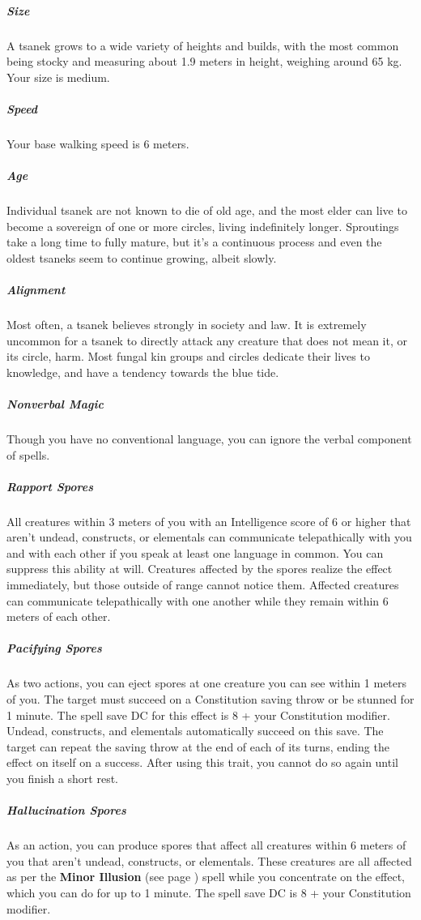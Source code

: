     \subparagraph{Size} A tsanek grows to a wide variety of heights and builds, with the most common being stocky and measuring about 1.9 meters in height, weighing around 65 kg.
    Your size is medium.

    \subparagraph{Speed} Your base walking speed is 6 meters.

    \subparagraph{Age} Individual tsanek are not known to die of old age, and the most elder can live to become a sovereign of one or more circles, living indefinitely longer.
    Sproutings take a long time to fully mature, but it's a continuous process and even the oldest tsaneks seem to continue growing, albeit slowly.

    \subparagraph{Alignment} Most often, a tsanek believes strongly in society and law.
    It is extremely uncommon for a tsanek to directly attack any creature that does not mean it, or its circle, harm.
    Most fungal kin groups and circles dedicate their lives to knowledge, and have a tendency towards the blue tide.

    \subparagraph{Nonverbal Magic} Though you have no conventional language, you can ignore the verbal component of spells.

    \subparagraph{Rapport Spores} All creatures within 3 meters of you with an Intelligence score of 6 or higher that aren't undead, constructs, or elementals can communicate telepathically with you and with each other if you speak at least one language in common.
    You can suppress this ability at will.
    Creatures affected by the spores realize the effect immediately, but those outside of range cannot notice them.
    Affected creatures can communicate telepathically with one another while they remain within 6 meters of each other.

    \subparagraph{Pacifying Spores} \label{kin::tsanek.pacifyingspores}
    As two actions, you can eject spores at one creature you can see within 1 meters of you.
    The target must succeed on a Constitution saving throw or be stunned for 1 minute.
    The spell save DC for this effect is 8 + your Constitution modifier.
    Undead, constructs, and elementals automatically succeed on this save.
    The target can repeat the saving throw at the end of each of its turns, ending the effect on itself on a success.
    After using this trait, you cannot do so again until you finish a short rest.

    \subparagraph{Hallucination Spores} As an action, you can produce spores that affect all creatures within 6 meters of you that aren't undead, constructs, or elementals.
    These creatures are all affected as per the \textbf{Minor Illusion} (see page \pageref{spell::minorillusion}) spell while you concentrate on the effect, which you can do for up to 1 minute.
    The spell save DC is 8 + your Constitution modifier.

